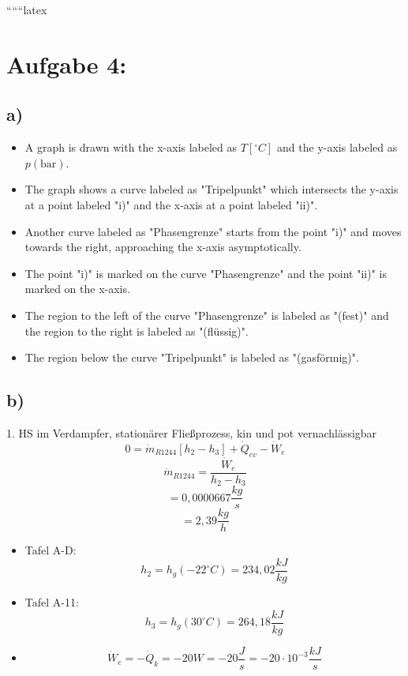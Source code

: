 
``````latex


\section*{Aufgabe 4:}

\subsection*{a)}
\begin{itemize}
    \item A graph is drawn with the x-axis labeled as $T [^\circ C]$ and the y-axis labeled as $p (\text{bar})$.
    \item The graph shows a curve labeled as "Tripelpunkt" which intersects the y-axis at a point labeled "i)" and the x-axis at a point labeled "ii)".
    \item Another curve labeled as "Phasengrenze" starts from the point "i)" and moves towards the right, approaching the x-axis asymptotically.
    \item The point "i)" is marked on the curve "Phasengrenze" and the point "ii)" is marked on the x-axis.
    \item The region to the left of the curve "Phasengrenze" is labeled as "(fest)" and the region to the right is labeled as "(flüssig)".
    \item The region below the curve "Tripelpunkt" is labeled as "(gasförmig)".
\end{itemize}

\subsection*{b)}
1. HS im Verdampfer, stationärer Fließprozess, kin und pot vernachlässigbar \\
\[
0 = \dot{m}_{R1244} \left[ h_2 - h_3 \right] + \dot{Q}_{ev} - \dot{W}_e
\]
\[
\dot{m}_{R1244} = \frac{\dot{W}_e}{h_2 - h_3}
\]
\[
= 0{,}0000667 \frac{kg}{s}
\]
\[
= 2{,}39 \frac{kg}{h}
\]

\begin{itemize}
    \item Tafel A-D:
    \[
    h_2 = h_g (-22^\circ C) = 234{,}02 \frac{kJ}{kg}
    \]
    \item Tafel A-11:
    \[
    h_3 = h_g (30^\circ C) = 264{,}18 \frac{kJ}{kg}
    \]
    \item 
    \[
    \dot{W}_e = -\dot{Q}_{k} = -20 W = -20 \frac{J}{s} = -20 \cdot 10^{-3} \frac{kJ}{s}
    \]
\end{itemize}

